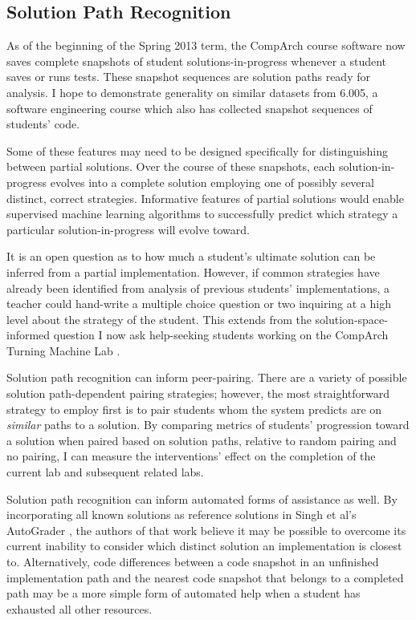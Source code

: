 \documentclass[12pt]{article}
\begin{document}
\subsection{Solution Path Recognition}


As of the beginning of the Spring 2013 term, the CompArch course software now saves complete snapshots of student solutions-in-progress whenever a student saves or runs tests. These snapshot sequences are solution paths ready for analysis. I hope to demonstrate generality on similar datasets from 6.005, a software engineering course which also has collected snapshot sequences of students' code.

Some of these features may need to be designed specifically for distinguishing between partial solutions. Over the course of these snapshots, each solution-in-progress evolves into a complete solution employing one of possibly several distinct, correct strategies. Informative features of partial solutions would enable supervised machine learning algorithms to successfully predict which strategy a particular solution-in-progress will evolve toward. 

It is an open question as to how much a student's ultimate solution can be inferred from a partial implementation. However, if common strategies have already been identified from analysis of previous students' implementations, a teacher could hand-write a multiple choice question or two inquiring at a high level about the strategy of the student. This extends from the solution-space-informed question I now ask help-seeking students working on the CompArch Turning Machine Lab \cite{ICERGlassman}.

Solution path recognition can inform peer-pairing. There are a variety of possible solution path-dependent pairing strategies; however, the most straightforward strategy to employ first is to pair students whom the system predicts are on {\em similar} paths to a solution. By comparing metrics of students' progression toward a solution when paired based on solution paths, relative to random pairing and no pairing, I can measure the interventions' effect on the completion of the current lab and subsequent related labs.

Solution path recognition can inform automated forms of assistance as well. By incorporating all known solutions as reference solutions in Singh et al's AutoGrader \cite{rishabh}, the authors of that work believe it may be possible to overcome its current inability to consider which distinct solution an implementation is closest to. Alternatively, code differences between a code snapshot in an unfinished implementation path and the nearest code snapshot that belongs to a completed path may be a more simple form of automated help when a student has exhausted all other resources. %
\end{document}
